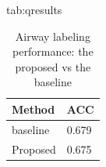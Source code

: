 \documentclass{midl} %
\begin{document}
\begin{table}[htbp]
\floatconts
{tab:qresults}
  {\caption{Airway labeling performance: the proposed vs the baseline}}%
  {\begin{tabular}{ll}
  \toprule
  \bfseries Method & \bfseries ACC\\
  \midrule
  baseline & 0.679\\
  \midrule
  Proposed & 0.675\\
  \bottomrule
  \end{tabular}
  }
\end{table}




\end{document}
